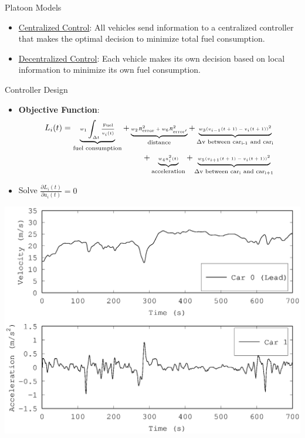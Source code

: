 \documentclass[12pt]{beamer}
\begin{document}
\begin{frame}{Platoon Models}
\begin{itemize}
\item \underline{\color{blue}Centralized  Control}: All vehicles send information to a centralized controller that makes the optimal decision to minimize total fuel consumption.


\item \underline{\color{blue}Decentralized Control}: Each vehicle makes its own decision based on local information to minimize its own fuel consumption.


\end{itemize}
\end{frame}

\begin{frame}{Controller Design}
\begin{itemize}
\item \textbf{Objective Function}:
\begin{align*} 
\tiny L_i(t) = \underbrace{w_1 \int_{\Delta t} \frac{\textrm{Fuel}}{v_i(t)}}_{\textrm{fuel consumption}}+ \underbrace{w_2 R_{\textrm{error}}^2 + w_6 R_{\textrm{error}'}^2}_{\textrm{distance}} + \underbrace{w_3(v_{i-1}(t+1) - v_{i}(t+1))^2}_{\textrm{$\Delta$v between car\textsubscript{i-1} and car\textsubscript{i}}} \\ \tiny
+ \underbrace{w_4a_i^2(t)}_{\textrm{acceleration}} +\underbrace{ w_5(v_{i+1}(t+1) - v_{i}(t+1))^2}_{\textrm{$\Delta$v between car\textsubscript{i} and car\textsubscript{i+1}}}
\end{align*}

\item Solve $\frac{\partial L_i(t)}{\partial a_i(t)} = 0$
\end{itemize}
\vspace{-.35in}
 \hfill \includegraphics[scale=.275]{media/acceleration.eps}

\end{frame}
\end{document}
